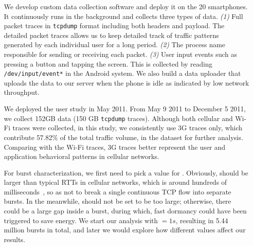 We develop custom data collection software and deploy it on the 20 smartphones. It continuously runs in the background and collects three types of data. {\em (1)} Full packet traces in \texttt{tcpdump} format including both headers and payload. The detailed packet traces allows us to keep detailed track of traffic patterns generated by each individual user for a long period. {\em (2)} The process name responsible for sending or receiving each packet.
{\em (3)} User input events such as pressing a button and tapping the screen. This is collected by reading \texttt{/dev/input/event*} in the Android system.
We also build a data uploader that uploads the data to our server when the phone is idle as indicated by low network throughput.

We deployed the user study in May 2011. From May 9 2011 to December 5 2011, we collect 152GB data (150 GB \texttt{tcpdump} traces). Although both cellular and Wi-Fi traces were collected, in this study, we consistently use 3G traces only, which contribute 57.82\% of the total traffic volume, in the \UMICH dataset for further analysis. Comparing with the Wi-Fi traces, 3G traces better represent the user and application behavioral patterns in cellular networks.


For burst characterization, we first need to pick a value for \BT. Obviously, \BT should be larger than typical RTTs in cellular networks, which is around hundreds of milliseconds~\cite{mobisys.3gtest, huang_mobisys12}, so as not to break a single continuous TCP flow into separate bursts. In the meanwhile, \BT should not be set to be too large; otherwise, there could be a large gap inside a burst, during which, fast dormancy could have been triggered to save energy. We start our analysis with \BT $= 1s$, resulting in 5.44 million bursts in total, and later we would explore how different \BT values affect our results.

